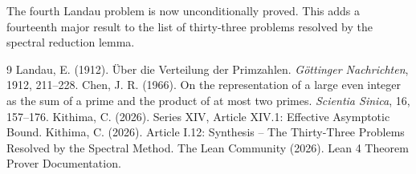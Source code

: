\documentclass[11pt,a4paper]{article}
\begin{document}
The fourth Landau problem is now unconditionally proved. This adds a fourteenth major result to the list of thirty‑three problems resolved by the spectral reduction lemma.


\begin{thebibliography}{9}
  Landau, E. (1912). Über die Verteilung der Primzahlen. \emph{Göttinger Nachrichten}, 1912, 211–228.
  Chen, J. R. (1966). On the representation of a large even integer as the sum of a prime and the product of at most two primes. \emph{Scientia Sinica}, 16, 157–176.
  Kithima, C. (2026). Series XIV, Article XIV.1: Effective Asymptotic Bound.
  Kithima, C. (2026). Article I.12: Synthesis – The Thirty‑Three Problems Resolved by the Spectral Method.
  The Lean Community (2026). Lean 4 Theorem Prover Documentation.
\end{thebibliography}
\end{document}

